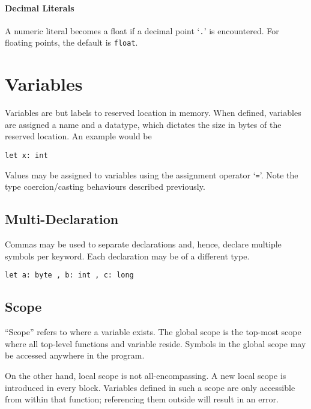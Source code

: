 \documentclass{article}
\begin{document}
\paragraph*{Decimal Literals}

A numeric literal becomes a float if a decimal point `\texttt{.}' is encountered.
For floating points, the default is \texttt{float}.

\section{Variables}

Variables are but labels to reserved location in memory.
When defined, variables are assigned a name and a datatype, which dictates the size in bytes of the reserved location.
An example would be

\begin{lstlisting}[language=CustomLang]
let x: int
\end{lstlisting}

Values may be assigned to variables using the assignment operator `\texttt{=}'.
Note the type coercion/casting behaviours described previously.

\subsection{Multi-Declaration}

Commas may be used to separate declarations and, hence, declare multiple symbols per keyword.
Each declaration may be of a different type.

\begin{lstlisting}[language=CustomLang]
let a: byte , b: int , c: long
\end{lstlisting}

\subsection{Scope}

``Scope'' refers to where a variable exists.
The global scope is the top-most scope where all top-level functions and variable reside.
Symbols in the global scope may be accessed anywhere in the program.

On the other hand, local scope is not all-encompassing.
A new local scope is introduced in every block.
Variables defined in such a scope are only accessible from within that function; referencing them outside will result in an error.
\end{document}
